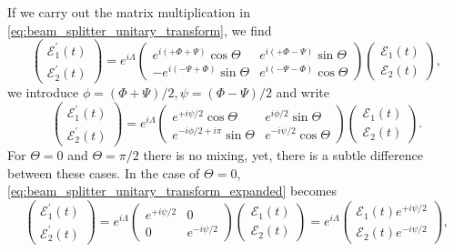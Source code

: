 If we carry out the matrix multiplication in \cref{eq:beam_splitter_unitary_transform}, we find
\begin{equation}
    \begin{pmatrix}
        \mathcal{E}_1^\prime(t)
        \\
        \mathcal{E}_2^\prime(t)
    \end{pmatrix}
    =
    e^{i\Lambda}
    \begin{pmatrix}
        e^{i(+\Phi+\Psi)}\cos\Theta & e^{i(+\Phi-\Psi)}\sin\Theta
        \\
        -e^{i(-\Psi+\Phi)}\sin\Theta & e^{i(-\Psi-\Phi)}\cos\Theta
    \end{pmatrix}
    \begin{pmatrix}
        \mathcal{E}_1(t)
        \\
        \mathcal{E}_2(t)
    \end{pmatrix},
\end{equation}
we introduce $\phi=(\Phi+\Psi)/2,\psi=(\Phi-\Psi)/2$ and write
\begin{equation}
    \begin{pmatrix}
        \mathcal{E}_1^\prime(t)
        \\
        \mathcal{E}_2^\prime(t)
    \end{pmatrix}
    =
    e^{i\Lambda}
    \begin{pmatrix}
        e^{+i\psi/2}\cos\Theta & e^{i\phi/2}\sin\Theta
        \\
        e^{-i\phi/2+i\pi}\sin\Theta & e^{-i\psi/2}\cos\Theta
    \end{pmatrix}
    \begin{pmatrix}
        \mathcal{E}_1(t)
        \\
        \mathcal{E}_2(t)
    \end{pmatrix}
    \label{eq:beam_splitter_unitary_transform_expanded}.
\end{equation}
For $\Theta=0$ and $\Theta=\pi/2$ there is no mixing, yet, there is a subtle difference between these cases.
In the case of $\Theta=0$, \cref{eq:beam_splitter_unitary_transform_expanded} becomes
\begin{equation}
    \begin{pmatrix}
        \mathcal{E}_1^\prime(t)
        \\
        \mathcal{E}_2^\prime(t)
    \end{pmatrix}
    =
    e^{i\Lambda}
    \begin{pmatrix}
        e^{+i\psi/2} & 0
        \\
        0 & e^{-i\psi/2}
    \end{pmatrix}
    \begin{pmatrix}
        \mathcal{E}_1(t)
        \\
        \mathcal{E}_2(t)
    \end{pmatrix}
    =
    e^{i\Lambda}
    \begin{pmatrix}
        \mathcal{E}_1(t)e^{+i\psi/2}
        \\
        \mathcal{E}_2(t)e^{-i\psi/2}
    \end{pmatrix}
    \label{eq:beam_splitter_unitary_transform_transmission},
\end{equation}
